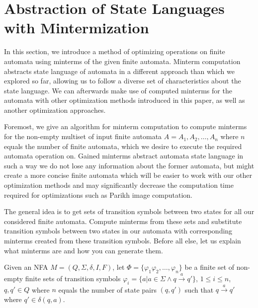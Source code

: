 
\section{Abstraction of State Languages with Mintermization}

In this section, we introduce a method of optimizing operations on finite automata using minterms of the given finite automata. Minterm computation abstracts state language of automata in a different approach than which we explored so far, allowing us to follow a diverse set of characteristics about the state language. We can afterwards make use of computed minterms for the automata with other optimization methods introduced in this paper, as well as another optimization approaches.

Foremost, we give an algorithm for minterm computation to compute minterms for the non-empty multiset of input finite automata $A = {A_1, A_2, \dots, A_n}$ where $n$ equals the number of finite automata, which we desire to execute the required automata operation on. Gained minterms abstract automata state language in such a way we do not lose any information about the former automata, but might create a more concise finite automata which will be easier to work with our other optimization methods and may significantly decrease the computation time required for optimizations such as Parikh image computation.

The general idea is to get sets of transition symbols between two states for all our considered finite automata. Compute minterms from these sets and substitute transition symbols between two states in our automata with corresponding minterms created from these transition symbols. Before all else, let us explain what minterms are and how you can generate them.

\begin{definition}
Given an NFA $M = (Q, \Sigma, \delta, I, F)$, let $\Phi = \{ \varphi_1 \varphi_2, \ldots, \varphi_n \}$ be a finite set of non-empty finite sets of transition symbols $\varphi_i = \{ a | a \in \Sigma \land q \xrightarrow{a} q' \}$, $ 1 \leq i \leq n$, $q, q' \in Q$ where $n$ equals the number of state pairs $(q, q')$ such that $q \xrightarrow{a} q'$ where $q' \in \delta(q, a)$.
\end{definition}

